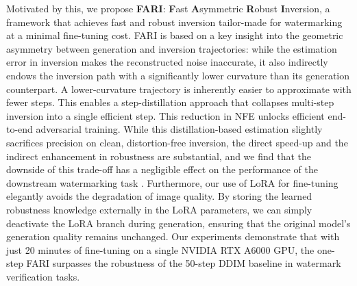\documentclass{article}
\begin{document}

Motivated by this, we propose \textbf{FARI}: \textbf{F}ast \textbf{A}symmetric \textbf{R}obust \textbf{I}nversion, a framework that achieves fast and robust inversion tailor-made for watermarking at a minimal fine-tuning cost. FARI is based on a key insight into the geometric asymmetry between generation and inversion trajectories: while the estimation error in inversion makes the reconstructed noise inaccurate, it also indirectly endows the inversion path with a significantly lower curvature than its generation counterpart. A lower-curvature trajectory is inherently easier to approximate with fewer steps. This enables a step-distillation approach that collapses multi-step inversion into a single efficient step. This reduction in NFE unlocks efficient end-to-end adversarial training. While this distillation-based estimation slightly sacrifices precision on clean, distortion-free inversion, the direct speed-up and the indirect enhancement in robustness are substantial, and we find that the downside of this trade-off has a negligible effect on the performance of the downstream watermarking task \citep{gs_2024, treering_2023}. Furthermore, our use of LoRA \citep{lora2022} for fine-tuning elegantly avoids the degradation of image quality. By storing the learned robustness knowledge externally in the LoRA parameters, we can simply deactivate the LoRA branch during generation, ensuring that the original model's generation quality remains unchanged.
Our experiments demonstrate that with just 20 minutes of fine-tuning on a single NVIDIA RTX A6000 GPU, the one-step FARI surpasses the robustness of the 50-step DDIM baseline in watermark verification tasks.

\end{document}
